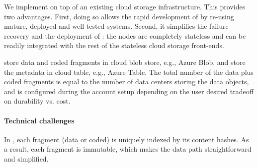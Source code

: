 We implement \name on top of an existing cloud storage infrastructure. This
provides two advantages. First, doing so allows the rapid development of \name
by re-using mature, deployed and well-tested systems. Second, it simplifies the
failure recovery and the deployment of \name: the \name nodes are completely
stateless and can be readily integrated with the rest of the stateless cloud
storage front-ends.

\name store data and coded fragments in cloud blob store, e.g., Azure Blob, and store the metadata in cloud table, 
e.g., Azure Table. 
The total number of the data plus coded fragments is equal to the number of data centers
storing the data objects, and is configured during the account setup depending on the user desired tradeoff on
durability vs. cost.

%


\paragraph{Technical challenges}
In \name, each fragment (data or coded) is uniquely indexed by its content hashes.
As a result, each fragment is immutable, which makes the data path straightforward and simplified. 

